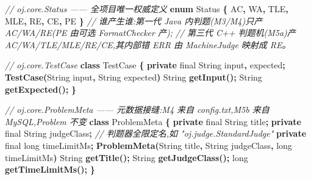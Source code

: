 \documentclass[
  11pt,
]{ctexart}
\newenvironment{Shaded}{\begin{snugshade}}{\end{snugshade}}
\newcommand{\BuiltInTok}[1]{#1}
\newcommand{\CommentTok}[1]{\textcolor[rgb]{0.56,0.35,0.01}{\textit{#1}}}
\newcommand{\DataTypeTok}[1]{\textcolor[rgb]{0.13,0.29,0.53}{#1}}
\newcommand{\FunctionTok}[1]{\textcolor[rgb]{0.13,0.29,0.53}{\textbf{#1}}}
\newcommand{\KeywordTok}[1]{\textcolor[rgb]{0.13,0.29,0.53}{\textbf{#1}}}
\newcommand{\NormalTok}[1]{#1}
\newcommand{\OperatorTok}[1]{\textcolor[rgb]{0.81,0.36,0.00}{\textbf{#1}}}
\begin{document}
\begin{Shaded}
\begin{Highlighting}[]
\CommentTok{// oj.core.Status  —— 全项目唯一权威定义}
\KeywordTok{enum}\NormalTok{ Status }\OperatorTok{\{}\NormalTok{ AC}\OperatorTok{,}\NormalTok{ WA}\OperatorTok{,}\NormalTok{ TLE}\OperatorTok{,}\NormalTok{ MLE}\OperatorTok{,}\NormalTok{ RE}\OperatorTok{,}\NormalTok{ CE}\OperatorTok{,}\NormalTok{ PE }\OperatorTok{\}}
\CommentTok{// 谁产生谁:第一代 Java 内判题(M3/M4)只产 AC/WA/RE(PE 由可选 FormatChecker 产);}
\CommentTok{//          第三代 C++ 判题机(M5a)产 AC/WA/TLE/MLE/RE/CE,其内部错 ERR 由 MachineJudge 映射成 RE。}

\CommentTok{// oj.core.TestCase}
\KeywordTok{class}\NormalTok{ TestCase }\OperatorTok{\{}
    \KeywordTok{private} \DataTypeTok{final} \BuiltInTok{String}\NormalTok{ input}\OperatorTok{,}\NormalTok{ expected}\OperatorTok{;}
    \FunctionTok{TestCase}\OperatorTok{(}\BuiltInTok{String}\NormalTok{ input}\OperatorTok{,} \BuiltInTok{String}\NormalTok{ expected}\OperatorTok{)}
    \BuiltInTok{String} \FunctionTok{getInput}\OperatorTok{();}  \BuiltInTok{String} \FunctionTok{getExpected}\OperatorTok{();}
\OperatorTok{\}}

\CommentTok{// oj.core.ProblemMeta  —— 元数据接缝:M4 来自 config.txt,M5b 来自 MySQL,Problem 不变}
\KeywordTok{class}\NormalTok{ ProblemMeta }\OperatorTok{\{}
    \KeywordTok{private} \DataTypeTok{final} \BuiltInTok{String}\NormalTok{ title}\OperatorTok{;}
    \KeywordTok{private} \DataTypeTok{final} \BuiltInTok{String}\NormalTok{ judgeClass}\OperatorTok{;}          \CommentTok{// 判题器全限定名,如 "oj.judge.StandardJudge"}
    \KeywordTok{private} \DataTypeTok{final} \DataTypeTok{long}\NormalTok{ timeLimitMs}\OperatorTok{;}
    \FunctionTok{ProblemMeta}\OperatorTok{(}\BuiltInTok{String}\NormalTok{ title}\OperatorTok{,} \BuiltInTok{String}\NormalTok{ judgeClass}\OperatorTok{,} \DataTypeTok{long}\NormalTok{ timeLimitMs}\OperatorTok{)}
    \BuiltInTok{String} \FunctionTok{getTitle}\OperatorTok{();} \BuiltInTok{String} \FunctionTok{getJudgeClass}\OperatorTok{();} \DataTypeTok{long} \FunctionTok{getTimeLimitMs}\OperatorTok{();}
\OperatorTok{\}}


\end{Highlighting}
\end{Shaded}
\end{document}
